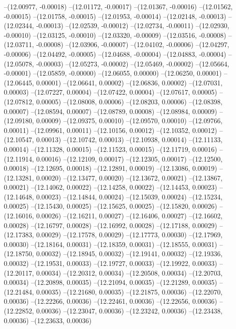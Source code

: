 --(12.00977, -0.00018)
--(12.01172, -0.00017)
--(12.01367, -0.00016)
--(12.01562, -0.00015)
--(12.01758, -0.00015)
--(12.01953, -0.00014)
--(12.02148, -0.00013)
--(12.02344, -0.00013)
--(12.02539, -0.00012)
--(12.02734, -0.00011)
--(12.02930, -0.00010)
--(12.03125, -0.00010)
--(12.03320, -0.00009)
--(12.03516, -0.00008)
--(12.03711, -0.00008)
--(12.03906, -0.00007)
--(12.04102, -0.00006)
--(12.04297, -0.00006)
--(12.04492, -0.00005)
--(12.04688, -0.00004)
--(12.04883, -0.00004)
--(12.05078, -0.00003)
--(12.05273, -0.00002)
--(12.05469, -0.00002)
--(12.05664, -0.00001)
--(12.05859, -0.00000)
--(12.06055, 0.00000)
--(12.06250, 0.00001)
--(12.06445, 0.00001)
--(12.06641, 0.00002)
--(12.06836, 0.00002)
--(12.07031, 0.00003)
--(12.07227, 0.00004)
--(12.07422, 0.00004)
--(12.07617, 0.00005)
--(12.07812, 0.00005)
--(12.08008, 0.00006)
--(12.08203, 0.00006)
--(12.08398, 0.00007)
--(12.08594, 0.00007)
--(12.08789, 0.00008)
--(12.08984, 0.00009)
--(12.09180, 0.00009)
--(12.09375, 0.00010)
--(12.09570, 0.00010)
--(12.09766, 0.00011)
--(12.09961, 0.00011)
--(12.10156, 0.00012)
--(12.10352, 0.00012)
--(12.10547, 0.00013)
--(12.10742, 0.00013)
--(12.10938, 0.00014)
--(12.11133, 0.00014)
--(12.11328, 0.00015)
--(12.11523, 0.00015)
--(12.11719, 0.00016)
--(12.11914, 0.00016)
--(12.12109, 0.00017)
--(12.12305, 0.00017)
--(12.12500, 0.00018)
--(12.12695, 0.00018)
--(12.12891, 0.00019)
--(12.13086, 0.00019)
--(12.13281, 0.00020)
--(12.13477, 0.00020)
--(12.13672, 0.00021)
--(12.13867, 0.00021)
--(12.14062, 0.00022)
--(12.14258, 0.00022)
--(12.14453, 0.00023)
--(12.14648, 0.00023)
--(12.14844, 0.00024)
--(12.15039, 0.00024)
--(12.15234, 0.00025)
--(12.15430, 0.00025)
--(12.15625, 0.00025)
--(12.15820, 0.00026)
--(12.16016, 0.00026)
--(12.16211, 0.00027)
--(12.16406, 0.00027)
--(12.16602, 0.00028)
--(12.16797, 0.00028)
--(12.16992, 0.00028)
--(12.17188, 0.00029)
--(12.17383, 0.00029)
--(12.17578, 0.00029)
--(12.17773, 0.00030)
--(12.17969, 0.00030)
--(12.18164, 0.00031)
--(12.18359, 0.00031)
--(12.18555, 0.00031)
--(12.18750, 0.00032)
--(12.18945, 0.00032)
--(12.19141, 0.00032)
--(12.19336, 0.00032)
--(12.19531, 0.00033)
--(12.19727, 0.00033)
--(12.19922, 0.00033)
--(12.20117, 0.00034)
--(12.20312, 0.00034)
--(12.20508, 0.00034)
--(12.20703, 0.00034)
--(12.20898, 0.00035)
--(12.21094, 0.00035)
--(12.21289, 0.00035)
--(12.21484, 0.00035)
--(12.21680, 0.00035)
--(12.21875, 0.00036)
--(12.22070, 0.00036)
--(12.22266, 0.00036)
--(12.22461, 0.00036)
--(12.22656, 0.00036)
--(12.22852, 0.00036)
--(12.23047, 0.00036)
--(12.23242, 0.00036)
--(12.23438, 0.00036)
--(12.23633, 0.00036)
